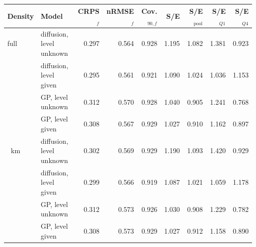 \begin{tabular}{llrrrrrrr}
\toprule
Density & Model & CRPS$_f$ & nRMSE$_f$ & Cov.$_{90,f}$ & S/E & S/E$_\mathrm{pool}$ & S/E$_{Q1}$ & S/E$_{Q4}$ \\
\midrule
full & diffusion, level unknown & 0.297 & 0.564 & 0.928 & 1.195 & 1.082 & 1.381 & 0.923 \\
 & diffusion, level given & 0.295 & 0.561 & 0.921 & 1.090 & 1.024 & 1.036 & 1.153 \\
 & GP, level unknown & 0.312 & 0.570 & 0.928 & 1.040 & 0.905 & 1.241 & 0.768 \\
 & GP, level given & 0.308 & 0.567 & 0.929 & 1.027 & 0.910 & 1.162 & 0.897 \\
\addlinespace
60~km & diffusion, level unknown & 0.302 & 0.569 & 0.929 & 1.190 & 1.093 & 1.420 & 0.929 \\
 & diffusion, level given & 0.299 & 0.566 & 0.919 & 1.087 & 1.021 & 1.059 & 1.178 \\
 & GP, level unknown & 0.312 & 0.573 & 0.926 & 1.030 & 0.908 & 1.229 & 0.782 \\
 & GP, level given & 0.308 & 0.573 & 0.929 & 1.027 & 0.912 & 1.158 & 0.890 \\
\bottomrule
\end{tabular}

